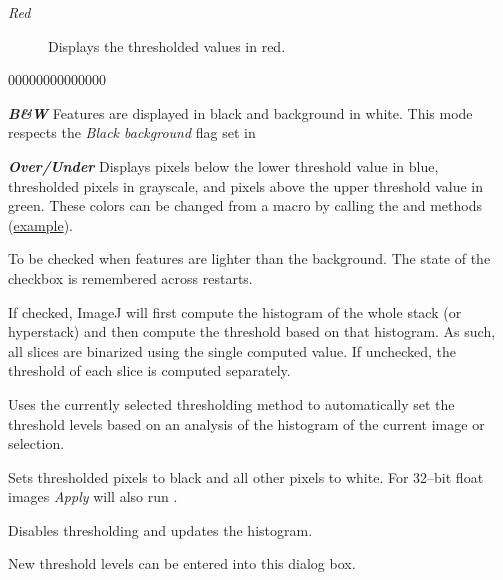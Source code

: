 \begin{description}
\begin{description}
\item [{\emph{Red}}] Displays the thresholded values in red. \end{description}
\begin{lyxlist}{00000000000000}
\item [{\textbf{\emph{B\&W}}}] \noindent Features are displayed in black
and background in white. This mode respects the \emph{Black background}
flag set in 
\item [{\textbf{\emph{Over/Under}}}] \noindent Displays pixels below the
lower threshold value in blue, thresholded pixels in grayscale, and
pixels above the upper threshold value in green. These colors can
be changed from a macro by calling the 
and  methods (\href{http://imagej.nih.gov/ij/macros/examples/SetOverUnderThresholdColors.txt}{example}).
\end{lyxlist}
\item [{\emph{Dark\ background}}] To be checked when features are lighter
than the background. The state of the checkbox is remembered across
restarts.
\item [{\emph{Stack\ histogram}}]  If checked, ImageJ will first compute
the histogram of the whole stack (or hyperstack) and then compute
the threshold based on that histogram. As such, all slices are binarized
using the single computed value. If unchecked, the threshold of each
slice is computed separately.
\item [{\emph{Auto}}] Uses the currently selected thresholding method to
automatically set the threshold levels based on an analysis of the
histogram of the current image or selection.
\item [{\emph{Apply}}] Sets thresholded pixels to black and all other pixels
to white. For 32--bit float images \emph{Apply} will also run .
\item [{\emph{Reset}}] Disables thresholding and updates the histogram.
\item [{\emph{Set}}] New threshold levels can be entered into this dialog
box.
\end{description}



